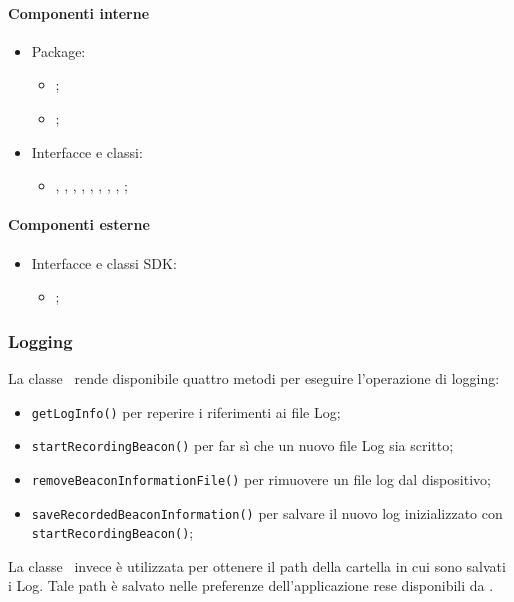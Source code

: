 \documentclass[../Funzionalita.tex]{subfiles}
\begin{document}
		\paragraph*{Componenti interne}
			\begin{itemize}
			
				\item Package:
				\begin{itemize}
					\item[] \view;
					\item[] \presenter;
				\end{itemize}
				
				\item Interfacce e classi:
				\begin{itemize}
					\item[] \MainDeveloperPresenter, \MainDeveloperActivity, \MainDeveloperView, \DeveloperUnlockerActivity, \DeveloperUnlockerView, \LoggingActivity, \LoggingView, \LogInformationActivity, \LogInformationView;
				\end{itemize}
				
			\end{itemize}
			
			
		\paragraph*{Componenti esterne}
			\begin{itemize}
				\item Interfacce e classi SDK:
				\begin{itemize}
					\item[] \AppCompatActivity;
				\end{itemize}
			\end{itemize}
	
	\newpage
	\subsubsection{Logging}
		La classe \InformationManagerImp\ rende disponibile quattro metodi per eseguire l'operazione di logging:
		\begin{itemize}
			\item \lstinline|getLogInfo()| per reperire i riferimenti ai file Log;
			\item \lstinline|startRecordingBeacon()| per far sì che un nuovo file Log sia scritto;
			\item \lstinline|removeBeaconInformationFile()| per rimuovere un file log dal dispositivo;
			\item \lstinline|saveRecordedBeaconInformation()| per salvare il nuovo log inizializzato con \lstinline|startRecordingBeacon()|;
		\end{itemize}
		La classe \Setting\ invece è utilizzata per ottenere il path della cartella in cui sono salvati i Log. Tale path è salvato nelle preferenze dell'applicazione rese disponibili da \SharedPreferences.
		
\end{document}
